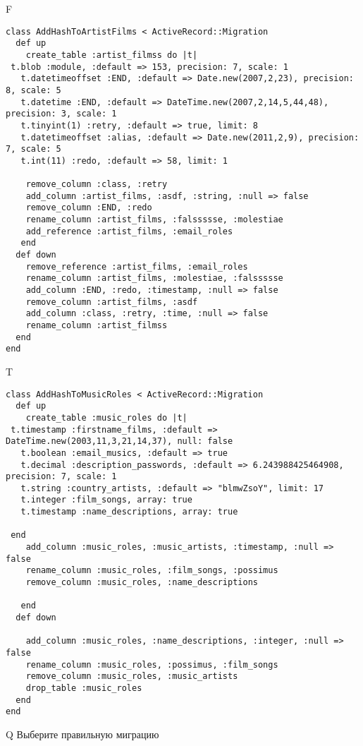 F
\begin{verbatim}
class AddHashToArtistFilms < ActiveRecord::Migration
  def up
    create_table :artist_filmss do |t| 
 t.blob :module, :default => 153, precision: 7, scale: 1
   t.datetimeoffset :END, :default => Date.new(2007,2,23), precision: 8, scale: 5
   t.datetime :END, :default => DateTime.new(2007,2,14,5,44,48), precision: 3, scale: 1
   t.tinyint(1) :retry, :default => true, limit: 8
   t.datetimeoffset :alias, :default => Date.new(2011,2,9), precision: 7, scale: 5
   t.int(11) :redo, :default => 58, limit: 1

    remove_column :class, :retry
    add_column :artist_films, :asdf, :string, :null => false
    remove_column :END, :redo
    rename_column :artist_films, :falssssse, :molestiae
    add_reference :artist_films, :email_roles
   end
  def down
    remove_reference :artist_films, :email_roles
    rename_column :artist_films, :molestiae, :falssssse
    add_column :END, :redo, :timestamp, :null => false
    remove_column :artist_films, :asdf
    add_column :class, :retry, :time, :null => false
    rename_column :artist_filmss
  end
end
\end{verbatim}

T
\begin{verbatim}
class AddHashToMusicRoles < ActiveRecord::Migration
  def up
    create_table :music_roles do |t|
 t.timestamp :firstname_films, :default => DateTime.new(2003,11,3,21,14,37), null: false
   t.boolean :email_musics, :default => true
   t.decimal :description_passwords, :default => 6.243988425464908, precision: 7, scale: 1
   t.string :country_artists, :default => "blmwZsoY", limit: 17
   t.integer :film_songs, array: true
   t.timestamp :name_descriptions, array: true

 end
    add_column :music_roles, :music_artists, :timestamp, :null => false
    rename_column :music_roles, :film_songs, :possimus
    remove_column :music_roles, :name_descriptions

   end
  def down

    add_column :music_roles, :name_descriptions, :integer, :null => false
    rename_column :music_roles, :possimus, :film_songs
    remove_column :music_roles, :music_artists
    drop_table :music_roles
  end
end
\end{verbatim}
Q
Выберите правильную миграцию

